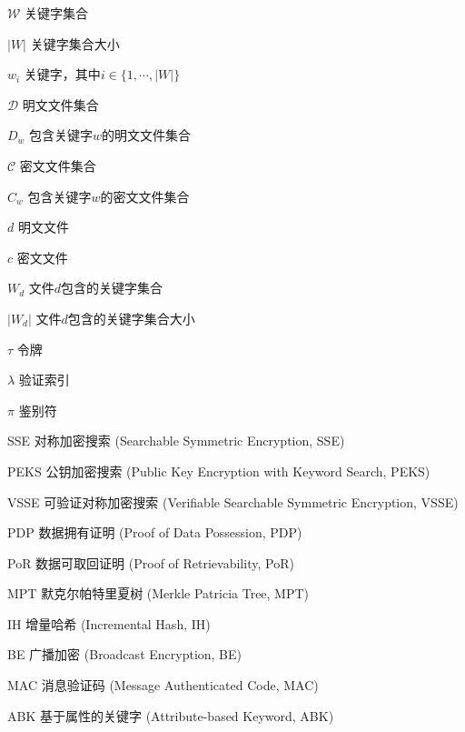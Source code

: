 \begin{denotation}[3cm]
  \item[$\mathcal{W}$] 关键字集合
  \item[$|W|$] 关键字集合大小
  \item[$w_i$ ] 关键字，其中$i \in \{1, \cdots, |W|\}$
  \item[$\mathcal{D}$] 明文文件集合
  \item[$D_{w}$] 包含关键字$w$的明文文件集合
  \item[$\mathcal{C}$] 密文文件集合
  \item[$C_{w}$] 包含关键字$w$的密文文件集合
  \item[$d$] 明文文件
  \item[$c$] 密文文件
  \item[$W_d$] 文件$d$包含的关键字集合
  \item[$|W_d|$] 文件$d$包含的关键字集合大小

  \item[$\tau$]	令牌
  \item[$\lambda$] 验证索引
  \item[$\pi$] 鉴别符
  \item[SSE] 对称加密搜索 (Searchable Symmetric Encryption, SSE)
  \item[PEKS] 公钥加密搜索 (Public Key Encryption with Keyword Search, PEKS)
  \item[VSSE] 可验证对称加密搜索 (Verifiable Searchable Symmetric Encryption, VSSE)


  \item[PDP] 数据拥有证明 (Proof of Data Possession, PDP)
  \item[PoR] 数据可取回证明 (Proof of Retrievability, PoR)

  \item[MPT] 默克尔帕特里夏树 (Merkle Patricia Tree, MPT)
  \item[IH] 增量哈希 (Incremental Hash, IH)
  \item[BE] 广播加密 (Broadcast Encryption, BE)
  \item[MAC] 消息验证码 (Message Authenticated Code, MAC)
  \item[ABK] 基于属性的关键字 (Attribute-based Keyword, ABK)

\end{denotation}
